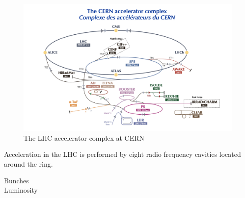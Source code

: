 \begin{figure}
	\includegraphics[width=\textwidth]{figures/accelerator_complex.png}
	\caption{The LHC accelerator complex at CERN}
	\label{fig:accelerator_complex}
\end{figure}

 Acceleration in the LHC is performed by eight radio frequency cavities located around the ring. 
 
 Bunches\\ 
 
 Luminosity